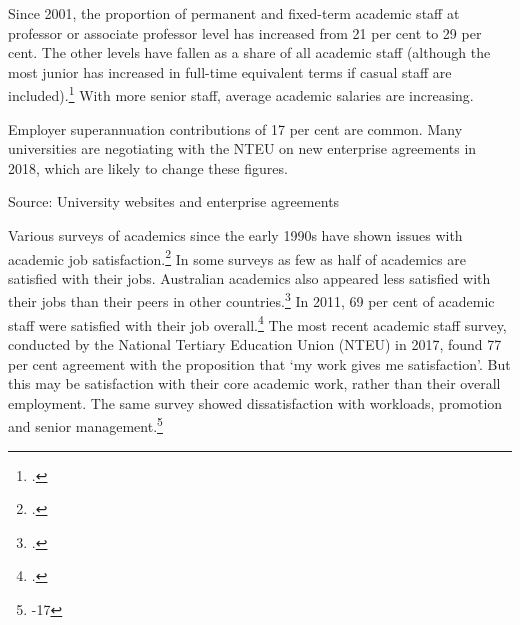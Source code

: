 \documentclass{grattan}
\begin{document}
Since 2001, the proportion of permanent and fixed-term academic staff at professor or associate professor level has increased from 21 per cent to 29 per cent. The other levels have fallen as a share of all academic staff (although the most junior has increased in full-time equivalent terms if casual staff are included).\footcite[][]{DepartmentofEducationandTraining2018ucubehighereduc} With more senior staff, average academic salaries are increasing.

\begin{table} \caption{Academic pay ranges, 2018}


\end{table}

Employer superannuation contributions of 17 per cent are common. Many universities are negotiating with the NTEU on new enterprise agreements in 2018, which are likely to change these figures.

Source: University websites and enterprise agreements

Various surveys of academics since the early 1990s have shown issues with academic job satisfaction.\footcite[][30]{Bentley2013factorsassociated} In some surveys as few as half of academics are satisfied with their jobs. Australian academics also appeared less satisfied with their jobs than their peers in other countries.\footcite[][247]{Bentley2013academicjobsatisf} In 2011, 69 per cent of academic staff were satisfied with their job overall.\footcite[][39]{Strachan2012workandcareersin} The most recent academic staff survey, conducted by the National Tertiary Education Union (NTEU) in 2017, found 77 per cent agreement with the proposition that `my work gives me satisfaction'. But this may be satisfaction with their core academic work, rather than their overall employment. The same survey showed dissatisfaction with workloads, promotion and senior management.\footnote{\textcite[][16]{NTEU20182017stateoftheun}-17}

%
\end{document}
